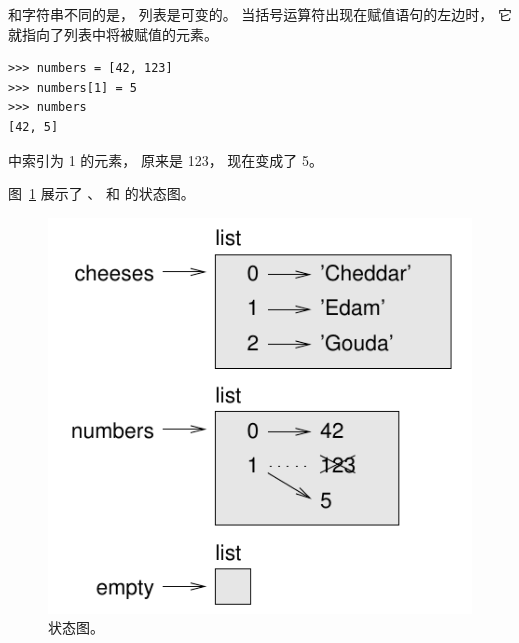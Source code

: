 %

和字符串不同的是， 列表是可变的。
当括号运算符出现在赋值语句的左边时， 它就指向了列表中将被赋值的元素。


\begin{lstlisting}
>>> numbers = [42, 123]
>>> numbers[1] = 5
>>> numbers
[42, 5]
\end{lstlisting}

%

 中索引为 1 的元素， 原来是 123， 现在变成了 5。
  

  

图~\ref{fig.liststate} 展示了  、  和  的状态图。

\begin{figure}
\centerline
{\includegraphics[scale=0.9]{../source/figs/liststate.pdf}}
\caption{状态图。  }
\label{fig.liststate}
\end{figure}

  

